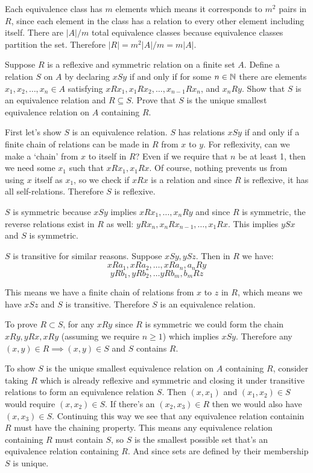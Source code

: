 \documentclass{article}
\begin{document}
Each equivalence class has $m$ elements which means it corresponds to $m^2$ pairs in $R$, since each element in the class has a relation to every other element including itself. There are $|A|/m$ total equivalence classes because equivalence classes partition the set. Therefore $|R| = m^2 |A| / m = m|A|$.

\begin{problem}
Suppose $R$ is a reflexive and symmetric relation on a finite set $A$. Define a relation $S$ on $A$ by declaring $xSy$ if and only if for some $n \in \mathbb{N}$ there are elements $x_1, x_2, \ldots, x_n \in A$ satisfying $xRx_1, x_1 R x_2, \ldots, x_{n-1} R x_n$, and $x_n R y$. Show that $S$ is an equivalence relation and $R \subseteq S$. Prove that $S$ is the unique smallest equivalence relation on $A$ containing $R$.
\end{problem}

First let's show $S$ is an equivalence relation. $S$ has relations $xSy$ if and only if a finite chain of relations can be made in $R$ from $x$ to $y$. For reflexivity, can we make a `chain' from $x$ to itself in $R$? Even if we require that $n$ be at least 1, then we need some $x_1$ such that $xRx_1, x_1Rx$. Of course, nothing prevents us from using $x$ itself as $x_1$, so we check if $xRx$ is a relation and since $R$ is reflexive, it has all self-relations. Therefore $S$ is reflexive.

$S$ is symmetric because $xSy$ implies $xRx_1, \ldots, x_n R y$ and since $R$ is symmetric, the reverse relations exist in $R$ as well: $yRx_n, x_n R x_{n-1}, \ldots , x_1 R x$. This implies $ySx$ and $S$ is symmetric.

$S$ is transitive for similar reasons. Suppose $xSy, ySz$. Then in $R$ we have:
$$xRa_1, xRa_2, \ldots , xRa_n, a_n R y$$
$$yRb_1, yRb_2, \ldots yRb_m, b_m R z$$

This means we have a finite chain of relations from $x$ to $z$ in $R$, which means we have $xSz$ and $S$ is transitive. Therefore $S$ is an equivalence relation.

To prove $R \subset S$, for any $xRy$ since $R$ is symmetric we could form the chain $xRy, yRx, xRy$ (assuming we require $n \geq 1$) which implies $xSy$. Therefore any $(x, y) \in R \implies (x, y) \in S$ and $S$ contains $R$.

To show $S$ is the unique smallest equivalence relation on $A$ containing $R$, consider taking $R$ which is already reflexive and symmetric and closing it under transitive relations to form an equivalence relation $S$. Then $(x, x_1)$ and $(x_1, x_2) \in S$ would require $(x, x_2) \in S$. If there's an $(x_2, x_3) \in R$ then we would also have $(x, x_3) \in S$. Continuing this way we see that any equivalence relation containin $R$ must have the chaining property. This means any equivalence relation containing $R$ must contain $S$, so $S$ is the smallest possible set that's an equivalence relation containing $R$. And since sets are defined by their membership $S$ is unique.
\end{document}
